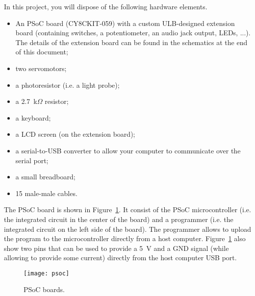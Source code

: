 In this project, you will dispose of the following hardware elements. 
\begin{itemize}
	\item An PSoC board (CY8CKIT-059) with a custom ULB-designed extension board (containing switches, a potentiometer, an audio jack output,  LEDs, ...). The details of the extension board can be found in the schematics at the end of this document; 
	\item two servomotors; 
	\item a photoresistor (i.e. a light probe); 
	\item a 2.7~k$\Omega$ resistor; 
	\item a keyboard; 
	\item a LCD screen (on the extension board); 
	\item a serial-to-USB converter to allow your computer to communicate over the serial port; 
	\item a small breadboard;  
	\item 15 male-male cables. 
\end{itemize}
The PSoC board is shown in Figure~\ref{fig:psoc}. It consist of the PSoC microcontroller (i.e. the integrated circuit in the center of the board) and a programmer (i.e. the integrated circuit on the left side of the board). The programmer allows to upload the program to the microcontroller directly from a host computer. Figure~\ref{fig:psoc} also show two pins that can be used to provide a 5~V and a GND signal (while allowing to provide some current) directly from the host computer USB port. 
\begin{figure}
	\centering
	\texttt{[image: psoc]}
	\caption{PSoC boards. }
	\label{fig:psoc}
\end{figure}